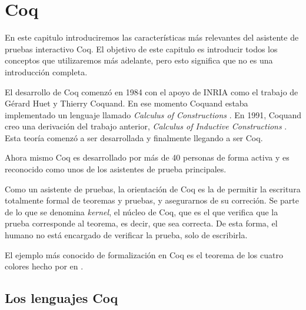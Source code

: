 \chapter{Coq}\label{ch:coq}

En este capitulo introduciremos las características más relevantes del asistente de pruebas interactivo Coq. El objetivo de este capitulo es introducir todos los conceptos que utilizaremos más adelante, pero esto significa que no es una introducción completa.

El desarrollo de Coq comenzó en 1984 con el apoyo de INRIA como el trabajo de Gérard Huet y Thierry Coquand. En ese momento Coquand estaba implementado un lenguaje llamado \emph{Calculus of Constructions} \cite{DBLP:journals/iandc/CoquandH88}.
En 1991, Coquand creo una derivación del trabajo anterior, \emph{Calculus of Inductive Constructions} \cite{CIC}. Esta teoría comenzó a ser desarrollada y finalmente llegando a ser Coq.

Ahora mismo Coq es desarrollado por más de 40 personas de forma activa y es reconocido como unos de los asistentes de prueba principales.

Como un asistente de pruebas, la orientación de Coq es la de permitir la escritura totalmente formal de teoremas y pruebas, y asegurarnos de su correción. Se parte de lo que se denomina \textit{kernel}, el núcleo de Coq, que es el que verifica que la prueba corresponde al teorema, es decir, que sea correcta. De esta forma, el humano no está encargado de verificar la prueba, solo de escribirla.

El ejemplo más conocido de formalización en Coq es el teorema de los cuatro colores \cite{DBLP:conf/ascm/Gonthier07} hecho por \citeauthor{DBLP:conf/ascm/Gonthier07} en \citeyear{DBLP:conf/ascm/Gonthier07}.

\section{Los lenguajes Coq}


